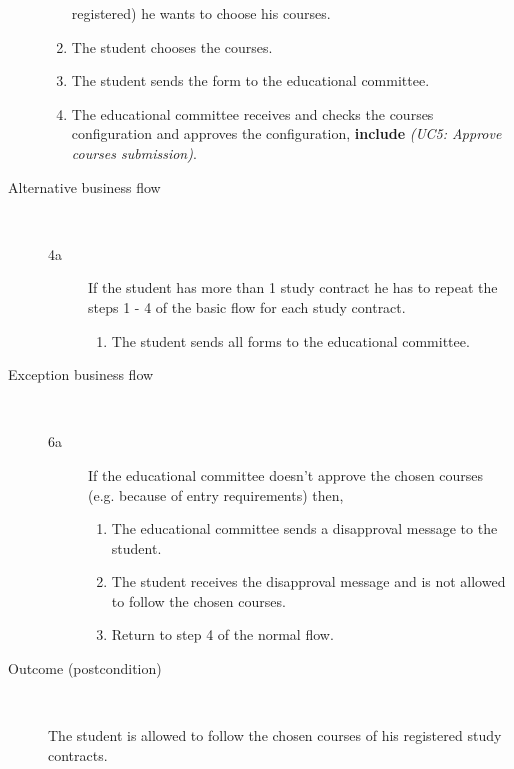 \begin{description}
\begin{enumerate}
	  	registered) he wants to choose his courses.
	  	\item The student chooses the courses.
	  	\item The student sends the form to the educational committee.
	  	\item The educational committee receives and checks the courses
	  	configuration and approves the configuration, \textbf{include} \emph{(UC5:
	  	Approve courses submission)}.
	\end{enumerate}
	\item[Alternative business flow] \
	\begin{description}
		\item[4a]If the student has more than 1 study contract he has to
		repeat the steps 1 - 4 of the basic flow for each study contract.
			\begin{enumerate} 
	  			\item The student sends all forms to the educational committee.
			\end{enumerate}
	\end{description}
	\item[Exception business flow] \ 
	\begin{description}
		\item[6a] If the educational committee doesn't approve
		the chosen courses (e.g. because of entry requirements) then,
		\begin{enumerate}
		 	\item The educational committee sends a disapproval message to the student.
		 	\item The student receives the disapproval message and is not allowed to
		 	follow the chosen courses.
		 	\item Return to step 4 of the normal flow.
		\end{enumerate}
	\end{description}
	\item[Outcome (postcondition)] \  
		\par The student is allowed to follow the chosen courses of his registered
		study contracts.
\end{description}
